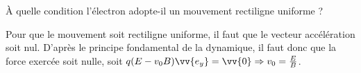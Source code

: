
\begin{enonce}
À quelle condition l'électron adopte-il un mouvement rectiligne uniforme ?
\end{enonce}


\begin{corrige}
Pour que le mouvement soit rectiligne uniforme, il faut que le vecteur accélération soit nul. D'après le principe fondamental de la dynamique, il faut donc que la force exercée soit nulle, soit 
$q(E-v_0B)\vv{e_y}=\vv{0} \Rightarrow v_0=\frac{E}{B}$.
\end{corrige}



\finEntrainement













\afficheReponsesMelangees

\finFicheEntrainement                                                                        %


\ifdefined\mainIsLoaded\else
\printReponsesEtCorriges
\fi
